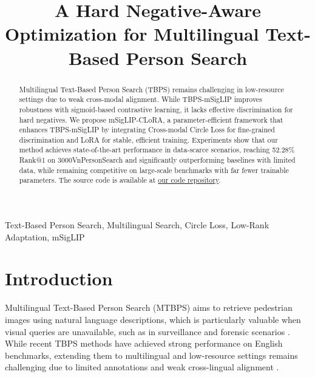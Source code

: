 \documentclass{article}
\begin{document}
\ninept

\title{A Hard Negative-Aware Optimization for Multilingual Text-Based Person Search}

\address{$^{\star}$~SEEE, Hanoi University of Science and Technology, Vietnam \\
$^{\dagger}$~Faculty of Electrical-Electronic Eng., University of Transport and Communications, Vietnam \\
$^{\ddagger}$~Faculty of Information Technology, Viet-Hung Industrial University, Vietnam}

\maketitle

\begin{abstract}
Multilingual Text-Based Person Search (TBPS) remains challenging in low-resource settings due to weak cross-modal alignment. While TBPS-mSigLIP improves robustness with sigmoid-based contrastive learning, it lacks effective discrimination for hard negatives. We propose mSigLIP-CLoRA, a parameter-efficient framework that enhances TBPS-mSigLIP by integrating Cross-modal Circle Loss for fine-grained discrimination and LoRA for stable, efficient training. Experiments show that our method achieves state-of-the-art performance in data-scarce scenarios, reaching 52.28\% Rank@1 on 3000VnPersonSearch and significantly outperforming baselines with limited data, while remaining competitive on large-scale benchmarks with far fewer trainable parameters. The source code is available at \href{https://github.com/pahmlam/Research_on_CircleLoss_for_TBPS-mSigLIP.git}{our code repository}.
\end{abstract}


\begin{keywords}
Text-Based Person Search, Multilingual Search, Circle Loss, Low-Rank Adaptation, mSigLIP
\end{keywords}

\section{Introduction}\label{intro}

Multilingual Text-Based Person Search (MTBPS) aims to retrieve pedestrian images using natural language descriptions, which is particularly valuable when visual queries are unavailable, such as in surveillance and forensic scenarios \cite{Li_2017_CVPR}. While recent TBPS methods have achieved strong performance on English benchmarks, extending them to multilingual and low-resource settings remains challenging due to limited annotations and weak cross-lingual alignment \cite{pmlr-v139-jia21b,9648695}.
\end{document}

